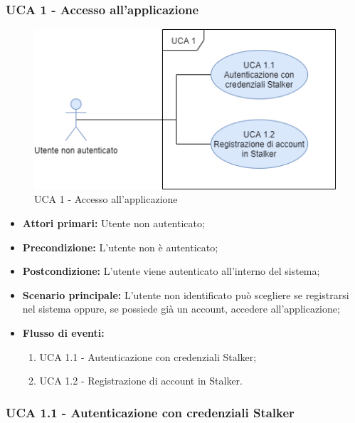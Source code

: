 \subsubsection{UCA 1 - Accesso all'applicazione}%

\begin{figure}[h]
  \centering
    \includegraphics[scale=0.8]{sezioni/UseCase/Immagini/UCA1.png}
  \caption{UCA 1 -  Accesso all'applicazione}
\end{figure}

\begin{itemize}
\item \textbf{Attori primari:} Utente non autenticato;
\item \textbf{Precondizione:} L'utente non è autenticato;
\item \textbf{Postcondizione:} L'utente viene autenticato all'interno del sistema;
\item \textbf{Scenario principale:} L'utente non identificato può scegliere se registrarsi nel sistema oppure, se possiede già un account, accedere all'applicazione; %
\item \textbf{Flusso di eventi:}
    \begin{enumerate}
        \item UCA 1.1 - Autenticazione con credenziali Stalker;
        \item UCA 1.2 - Registrazione di account in Stalker.
    \end{enumerate}

\end{itemize}

\subsubsection{UCA 1.1 - Autenticazione con credenziali Stalker}%

